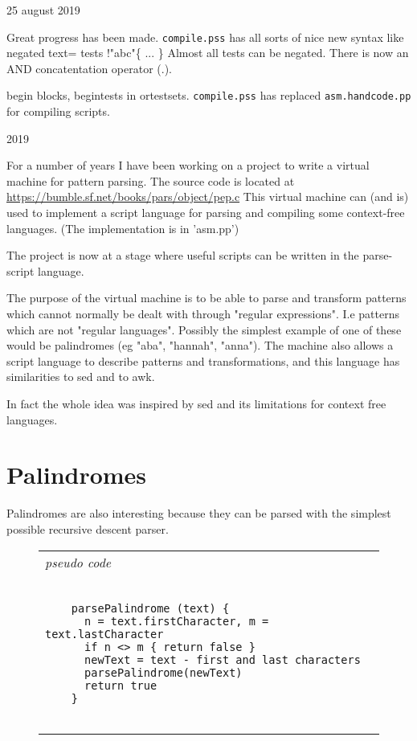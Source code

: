 \documentclass[a4paper,12pt]{article}
\begin{document}
  25 august 2019

    Great progress has been made. \texttt{compile.pss} has all sorts of
    nice new syntax like negated text= tests !"abc"\{ ... \}
    Almost all tests can be negated. There is now an AND concatentation
    operator (.).

    begin blocks, begintests in ortestsets. \texttt{compile.pss}
    has replaced \texttt{asm.handcode.pp} for compiling scripts.

2019

  For a number of years I have been working on a project to write
  a virtual machine for pattern parsing. The source code is located
  at \url{https://bumble.sf.net/books/pars/object/pep.c}
  This virtual machine can (and is) used to implement a script language
  for parsing and compiling some context-free languages. (The implementation
  is in 'asm.pp')

  The project is now at a stage where useful scripts can be written in
  the parse-script language.

  The purpose of the virtual machine is to be able to parse and transform
  patterns which cannot normally be dealt with through "regular expressions".
  I.e patterns which are not "regular languages". Possibly the simplest
  example of one of these would be palindromes (eg "aba", "hannah", "anna").
  The machine also allows a script language to describe patterns and
  transformations, and this language has similarities to sed and to awk.

  In fact the whole idea was inspired by sed and its limitations for
  context free languages.

\section{Palindromes}

 Palindromes are also interesting because they can be parsed with the
 simplest possible recursive descent parser.
 \begin{figure}
 \begin{tabular}{ l }
 \emph{ pseudo code } \\ 
 \begin{lstlisting}[breaklines] 

    parsePalindrome (text) {
      n = text.firstCharacter, m = text.lastCharacter
      if n <> m { return false }
      newText = text - first and last characters
      parsePalindrome(newText)
      return true
    }
  
 \end{lstlisting} 
 \end{tabular} 

 \end{figure}
\end{document}
